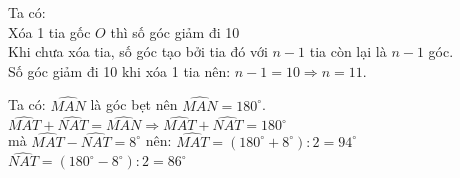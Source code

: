 \begin{Answer}{15}
		Ta có:\\
		Xóa 1 tia gốc $O$ thì số góc giảm đi 10\\
		Khi chưa xóa tia, số góc tạo bởi tia đó với $n-1$ tia còn lại là $n-1$ góc.\\
		Số góc giảm đi 10 khi xóa 1 tia nên: $n-1=10 \Rightarrow n=11$.
	
\end{Answer}
\begin{Answer}{16}
		Ta có: $\widehat{MAN}$ là góc bẹt nên $\widehat{MAN}={{180}^\circ}$.\\
		$\widehat{MAT}+\widehat{NAT}=\widehat{MAN}\Rightarrow \widehat{MAT}+\widehat{NAT}={{180}^\circ}$\\
		mà  $\widehat{MAT}-\widehat{NAT}={{8}^\circ}$  nên:
		$\widehat{MAT}=\left({{180}^\circ}+{{8}^\circ}\right):2={{94}^\circ}$ \\
		$\widehat{NAT}=\left({{180}^\circ}-{{8}^\circ}\right):2={{86}^\circ}$ \\
	
\end{Answer}
